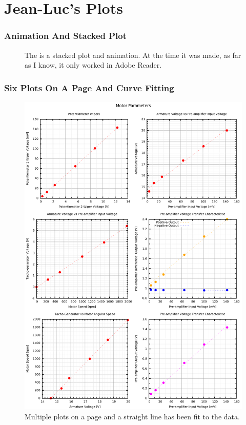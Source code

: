 \documentclass[10pt,a4paper,final]{report}
\begin{document}


\tableofcontents

\part*{Jean-Luc's Plots}

\section{Animation And Stacked Plot}
\begin{figure}[htbp]
    \centering
    \caption{The is a stacked plot and animation.  At the time it was made, as far as I know, it only worked in Adobe Reader.}
\end{figure}


\section{Six Plots On A Page And Curve Fitting}
\begin{figure}[!hbtp]
\centering
\includegraphics[width=\textwidth]{../CodeJeanLuc/MotorGraphGnuplot/OpenLoopMotorPlots.pdf}
\caption{Multiple plots on a page and a straight line has been fit to the data.}
\end{figure}

\end{document}
